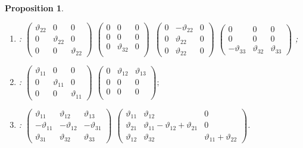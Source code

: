 \documentclass[11pt,twoside,reqno]{amsart}
\theoremstyle{plain}
\newtheorem{proposition}[thm]{Proposition}
\theoremstyle{definition}
\begin{document}
\begin{proposition}
\begin{enumerate}
\item[$D_{11}$] : 
$\left(\begin{array}{ccc}
\vartheta_{22}&0&0\\
0&\vartheta_{22}&0\\
0&0&\vartheta_{22}
\end{array}
\right)$
$\left(\begin{array}{ccc}
0&0&0\\
0&0&0\\
0&\vartheta_{32}&0\\
\end{array}
\right) $\ 
$\left(\begin{array}{ccc}
0&-\vartheta_{22}&0\\
0&\vartheta_{22}&0\\
0&\vartheta_{22}&0
\end{array}
\right) $
$\left(\begin{array}{ccc}
0&0&0\\
0&0&0\\
-\vartheta_{33}&\vartheta_{32}&\vartheta_{33}
\end{array}
\right)$
;
\item[$D_{12}$] : 
$\left(\begin{array}{ccc}
\vartheta_{11}&0&0\\
0&\vartheta_{11}&0\\
0&0&\vartheta_{11}
\end{array}
\right)$
$\left(\begin{array}{ccc}
0&\vartheta_{12}&\vartheta_{13}\\
0&0&0\\
0&0&0\\
\end{array}
\right) ; $
\item[$D_{13}$] :  
$\left(\begin{array}{ccc}
\vartheta_{11}&\vartheta_{12}&\vartheta_{13}\\
-\vartheta_{11}&-\vartheta_{12}&-\vartheta_{31}\\
\vartheta_{31}&\vartheta_{32}&\vartheta_{33}
\end{array}
\right)$
$\left(\begin{array}{ccc}
\vartheta_{11}&\vartheta_{12}&0\\
\vartheta_{21}&\vartheta_{11}-\vartheta_{12}+\vartheta_{21}&0\\
\vartheta_{12}&\vartheta_{32}&\vartheta_{11}+\vartheta_{22}
\end{array}
\right)$.
\end{enumerate}
\end{proposition}
\end{document}
